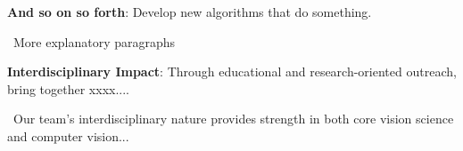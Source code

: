 \vspace{.5ex}
\begin{myaim}
{\bf And so on so forth}: Develop new algorithms that do something.
\end{myaim}
\vspace*{-1.1ex}
\hangindent=10pt \ More explanatory paragraphs

\vspace{.5ex}
\begin{myaim}
{\bf Interdisciplinary Impact}: Through educational and research-oriented outreach, bring together xxxx....
\end{myaim}
\vspace*{-1.1ex}
\hangindent=10pt \ Our team's interdisciplinary nature provides strength in both core vision science and computer vision...